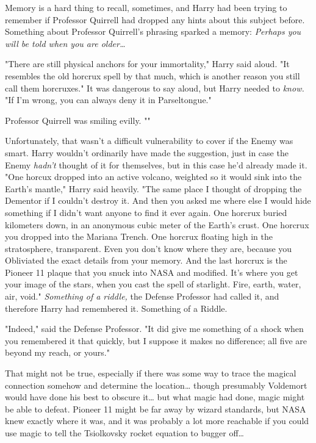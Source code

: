 Memory is a hard thing to recall, sometimes, and Harry had been trying to
remember if Professor Quirrell had dropped any hints about this subject before.
Something about Professor Quirrell's phrasing sparked a memory: \emph{Perhaps
you will be told when you are older{\ldots}}

"There are still physical anchors for your immortality," Harry said aloud. "It
resembles the old horcrux spell by that much, which is another reason you still
call them horcruxes." It was dangerous to say aloud, but Harry needed to
\emph{know.} "If I'm wrong, you can always deny it in Parseltongue."

Professor Quirrell was smiling evilly. ""

Unfortunately, that wasn't a difficult vulnerability to cover if the Enemy was
smart. Harry wouldn't ordinarily have made the suggestion, just in case the
Enemy \emph{hadn't} thought of it for themselves, but in this case he'd already
made it. "One horcux dropped into an active volcano, weighted so it would sink
into the Earth's mantle," Harry said heavily. "The same place I thought of
dropping the Dementor if I couldn't destroy it. And then you asked me where
else I would hide something if I didn't want anyone to find it ever again. One
horcrux buried kilometers down, in an anonymous cubic meter of the Earth's
crust. One horcrux you dropped into the Mariana Trench. One horcrux floating
high in the stratosphere, transparent. Even you don't know where they are,
because you Obliviated the exact details from your memory. And the last horcrux
is the Pioneer 11 plaque that you snuck into NASA and modified. It's where you
get your image of the stars, when you cast the spell of starlight. Fire, earth,
water, air, void." \emph{Something of a riddle,} the Defense Professor had
called it, and therefore Harry had remembered it. Something of a Riddle.

"Indeed," said the Defense Professor. "It did give me something of a shock when
you remembered it that quickly, but I suppose it makes no difference; all five
are beyond my reach, or yours."

That might not be true, especially if there was some way to trace the magical
connection somehow and determine the location{\ldots} though presumably
Voldemort would have done his best to obscure it{\ldots} but what magic had
done, magic might be able to defeat. Pioneer 11 might be far away by wizard
standards, but NASA knew exactly where it was, and it was probably a lot more
reachable if you could use magic to tell the Tsiolkovsky rocket equation to
bugger off{\ldots}

